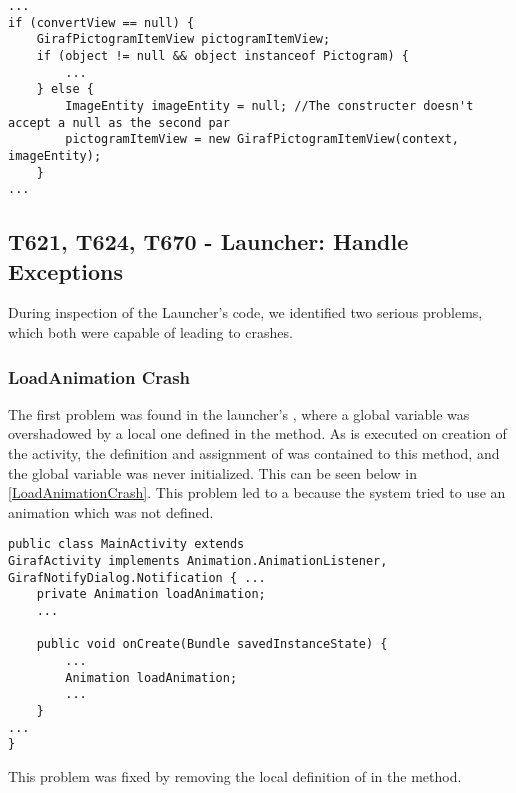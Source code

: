 \begin{minipage}[H]{\linewidth}
\begin{lstlisting}[caption = Return dummy object in case of null-valued object., label = UnitImageEntity] 
...
if (convertView == null) {
	GirafPictogramItemView pictogramItemView;
    if (object != null && object instanceof Pictogram) {
    	...
    } else {
    	ImageEntity imageEntity = null; //The constructer doesn't accept a null as the second par 
    	pictogramItemView = new GirafPictogramItemView(context, imageEntity); 
  	}
...
\end{lstlisting}
\end{minipage}

\subsection{T621, T624, T670 - Launcher: Handle Exceptions}
During inspection of the Launcher's code, we identified two serious problems,
which both were capable of leading to crashes.

\subsubsection{LoadAnimation Crash}
The first problem was found in the launcher's , where a
global variable  was overshadowed by a local one defined in
the  method. As  is executed on creation of the
activity, the definition and assignment of  was contained
to this method, and the global variable was never initialized. This can be seen
below in \autoref{LoadAnimationCrash}. This problem led to a
 because the system tried to use an animation which
was not defined.\nl

\begin{minipage}[H]{\linewidth}
\begin{lstlisting}[caption = The variable \textc{loadAnimation} is overshadowed locally., label = LoadAnimationCrash] 
public class MainActivity extends
GirafActivity implements Animation.AnimationListener, GirafNotifyDialog.Notification { ...
    private Animation loadAnimation;
    ...
    
	public void onCreate(Bundle savedInstanceState) {
		...	
    	Animation loadAnimation;
		...
	}
...
}    
\end{lstlisting}
\end{minipage}

This problem was fixed by removing the local definition of 
in the  method.

